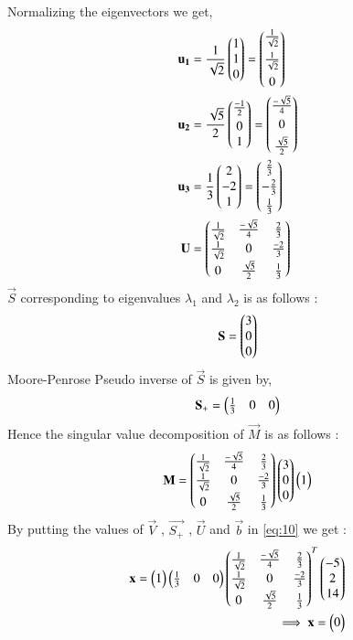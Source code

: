 \documentclass[journal,12pt,twocolumn]{IEEEtran}
\begin{document}
Normalizing the eigenvectors we get,
\begin{align}
\mathbf{u_1} &= \frac{1}{\sqrt{2}}\begin{pmatrix}1\\1\\0\end{pmatrix} = \begin{pmatrix}\frac{1}{\sqrt{2}}\\[0.2cm]\frac{1}{\sqrt{2}}\\[0.2cm]0\end{pmatrix}\\
\mathbf{u_2} &= \frac{\sqrt{5}}{2}\begin{pmatrix}\frac{-1}{2}\\[0.1cm]0\\1\end{pmatrix}=\begin{pmatrix}\frac{-\sqrt{5}}{4}\\[0.1cm]0\\[0.1cm]\frac{\sqrt{5}}{2}\end{pmatrix}\\
\mathbf{u_3} &= \frac{1}{3}\begin{pmatrix}2\\-2\\1\end{pmatrix}= \begin{pmatrix}\frac{2}{3}\\[0.1cm]-\frac{2}{3}\\[0.1cm]\frac{1}{3}\end{pmatrix}\\
\mathbf{U} &= \begin{pmatrix}\frac{1}{\sqrt{2}} &\frac{-\sqrt{5}}{4}&\frac{2}{3}\\[0.1cm]\frac{1}{\sqrt{2}}&0&\frac{-2}{3}\\[0.1cm]0&\frac{\sqrt{5}}{2}&\frac{1}{3}\end{pmatrix}
\end{align} 
$\vec{S}$ corresponding to eigenvalues $\lambda_1$ and $\lambda_2$ is as follows : 
\begin{align}
\mathbf{S} = \begin{pmatrix}3\\0\\0\end{pmatrix}
\end{align}
Moore-Penrose Pseudo inverse of $\vec{S}$ is given by,
\begin{align}
\mathbf{S}_+ = \begin{pmatrix}\frac{1}{3}&0&0\end{pmatrix}
\end{align}
Hence the singular value decomposition of $\vec{M}$ is as follows : 
\begin{align}
\mathbf{M} = \begin{pmatrix}\frac{1}{\sqrt{2}} &\frac{-\sqrt{5}}{4}&\frac{2}{3}\\[0.1cm]\frac{1}{\sqrt{2}}&0&\frac{-2}{3}\\[0.1cm]0&\frac{\sqrt{5}}{2}&\frac{1}{3}\end{pmatrix}\begin{pmatrix}3\\0\\0\end{pmatrix}\begin{pmatrix}1\end{pmatrix}
\end{align}
By putting the values of $\vec{V}$ ,  $\vec{S_+}$ , $\vec{U}$ and $\vec{b}$ in \eqref{eq:10} we get : 
\begin{align}
\mathbf{x}=\begin{pmatrix}1\end{pmatrix}\begin{pmatrix}\frac{1}{3}&0&0\end{pmatrix}\begin{pmatrix}\frac{1}{\sqrt{2}} &\frac{-\sqrt{5}}{4}&\frac{2}{3}\\[0.1cm]\frac{1}{\sqrt{2}}&0&\frac{-2}{3}\\[0.1cm]0&\frac{\sqrt{5}}{2}&\frac{1}{3}\end{pmatrix}^T\begin{pmatrix}-5\\2\\14\end{pmatrix}\\
\implies \mathbf{x} = \begin{pmatrix}0\end{pmatrix}\label{eq:31}
\end{align}
\end{document}
